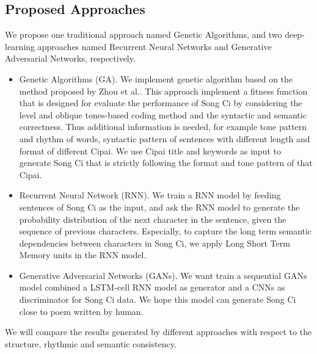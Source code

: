 \subsection{Proposed Approaches}
%
We propose one traditional approach named Genetic Algorithms, and two deep-learning approaches named Recurrent Neural Networks and Generative Adversarial Networks, respectively.
\begin{itemize}
\item { Genetic Algorithms (GA).} 
%
We implement genetic algorithm based on the method proposed by Zhou et al.\cite{zhou2010genetic}.
%
This approach implement a fitness function that is designed for evaluate the performance of Song Ci by considering the level and oblique tones-based coding method and the syntactic and semantic correctness.
%
Thus additional information is needed, for example tone pattern and rhythm of words, syntactic pattern of sentences with different length and format of different Cipai.
%
We use Cipai title and keywords as input to generate Song Ci that is strictly following the format and tone pattern of that Cipai.
\item {Recurrent Neural Network (RNN).} 
%
We train a RNN model by feeding sentences of Song Ci as the input, and ask the RNN model to generate the probability distribution of the next character in the sentence, given the sequence of previous characters.
%
Especially, to capture the long term semantic dependencies between characters in Song Ci,
%
we apply Long Short Term Memory units in the RNN model.
%
\item{Generative Adversarial Networks (GANs).}  We want train a sequential GANs model combined a LSTM-cell RNN model as generator and a CNNs as discriminator for Song Ci data. We hope this model can generate Song Ci close to poem written by human.
%
\end{itemize}
We will compare the results generated by different approaches with respect to the structure, rhythmic and semantic consistency. 
 

